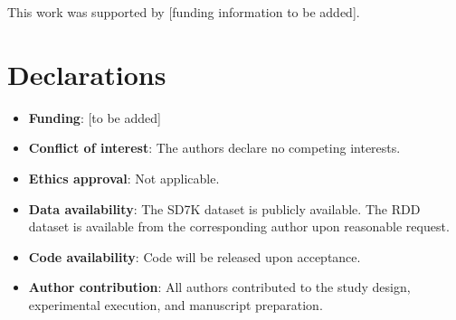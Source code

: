 \documentclass[pdflatex,sn-basic,Numbered]{sn-jnl}
\theoremstyle{thmstyleone}
\theoremstyle{thmstyletwo}
\theoremstyle{thmstylethree}
\begin{document}
\backmatter

This work was supported by [funding information to be added].

\section*{Declarations}

\begin{itemize}
  \item \textbf{Funding}: [to be added]
  \item \textbf{Conflict of interest}: The authors declare no competing interests.
  \item \textbf{Ethics approval}: Not applicable.
  \item \textbf{Data availability}: The SD7K dataset is publicly available. The RDD dataset is available from the corresponding author upon reasonable request.
  \item \textbf{Code availability}: Code will be released upon acceptance.
  \item \textbf{Author contribution}: All authors contributed to the study design, experimental execution, and manuscript preparation.
\end{itemize}
\end{document}

